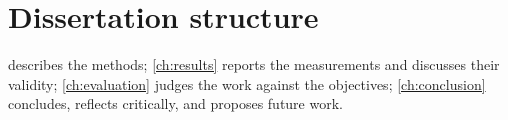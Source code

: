 \section{Dissertation structure}
\label{sec:structure}

 describes the methods; \cref{ch:results} reports the measurements
and discusses their validity; \cref{ch:evaluation} judges the work against the
objectives; \cref{ch:conclusion} concludes, reflects critically, and proposes future
work.
